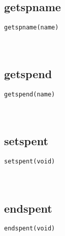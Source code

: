 \documentclass[10pt,a4paper]{article}
\begin{document}
\subsection{getspname}
\begin{spacing}{2.0}
\lstset{language=C,numbers=none}
\begin{lstlisting}
getspname(name)
\end{lstlisting}
{\large\color[rgb]{0.2,0.4,0.6}{name:}}
\paragraph{ \ \ }
\end{spacing}

\subsection{getspend}
\begin{spacing}{2.0}
\lstset{language=C,numbers=none}
\begin{lstlisting}
getspend(name)
\end{lstlisting}
{\large\color[rgb]{0.2,0.4,0.6}{name:}}
\paragraph{ \ \ }
\end{spacing}

\subsection{setspent}
\begin{spacing}{2.0}
\lstset{language=C,numbers=none}
\begin{lstlisting}
setspent(void)
\end{lstlisting}
{\large\color[rgb]{0.2,0.4,0.6}{void:}}
\paragraph{ \ \ }
\end{spacing}

\subsection{endspent}
\begin{spacing}{2.0}
\lstset{language=C,numbers=none}
\begin{lstlisting}
endspent(void)
\end{lstlisting}
{\large\color[rgb]{0.2,0.4,0.6}{void:}}
\paragraph{ \ \ }
\end{spacing}
\end{document}
